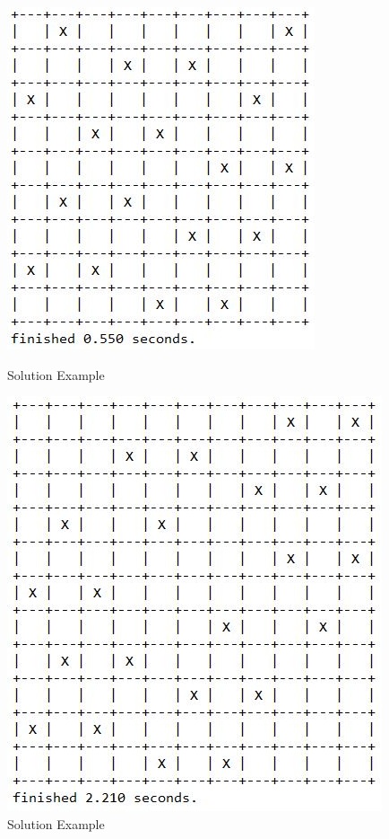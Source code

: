 \documentclass[runningheads]{llncs}
\begin{document}
\begin{figure}
    \begin{center}
        \includegraphics[scale=0.5]{images/gap9.jpg}
        \caption{Solution Example} \label{fig3}
    \end{center}
    \begin{center}
        \includegraphics[scale=0.5]{images/gap11.jpg}
        \caption{Solution Example} \label{fig4}
    \end{center}
\end{figure}
\end{document}
